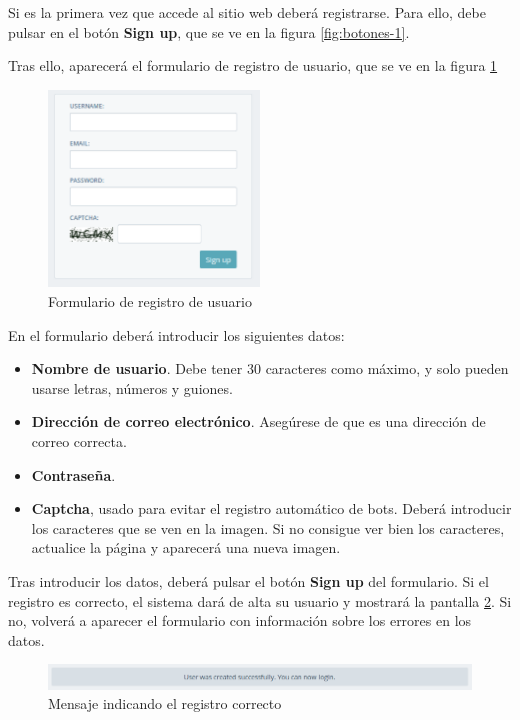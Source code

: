Si es la primera vez que accede al sitio web deberá registrarse. Para ello, debe
pulsar en el botón \textbf{Sign up}, que se ve en la figura \ref{fig:botones-1}.

Tras ello, aparecerá el formulario de registro de usuario, que se ve en la
figura \ref{fig:registro}

\begin{figure}[hbtp]
  \centering
  \includegraphics[width=0.5\textwidth]{apendice_manual_usuario/formulario_registro.png}
  \caption{Formulario de registro de usuario}
  \label{fig:registro}
\end{figure}

En el formulario deberá introducir los siguientes datos:

\begin{itemize}
\item \textbf{Nombre de usuario}. Debe tener 30 caracteres como máximo, y solo
  pueden usarse letras, números y guiones.
\item \textbf{Dirección de correo electrónico}. Asegúrese de que es una
  dirección de correo correcta.
\item \textbf{Contraseña}.
\item \textbf{Captcha}, usado para evitar el registro automático de bots. Deberá
  introducir los caracteres que se ven en la imagen. Si no consigue ver bien los
  caracteres, actualice la página y aparecerá una nueva imagen.
\end{itemize}

Tras introducir los datos, deberá pulsar el botón \textbf{Sign up} del
formulario. Si el registro es correcto, el sistema dará de alta su usuario y
mostrará la pantalla \ref{fig:registro-correcto}. Si no, volverá a aparecer el
formulario con información sobre los errores en los datos.

\begin{figure}[hbtp]
  \centering
  \includegraphics[width=\textwidth]{apendice_manual_usuario/pantalla_register_completo.png}
  \caption{Mensaje indicando el registro correcto}
  \label{fig:registro-correcto}
\end{figure}

